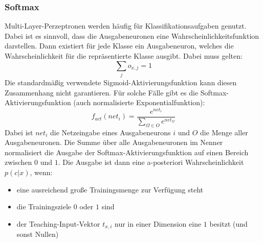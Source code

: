 \subsubsection*{Softmax}
Multi-Layer-Perzeptronen werden häufig für Klassifikationsaufgaben genutzt. Dabei ist es sinnvoll, dass die Ausgabeneuronen eine Wahrscheinlichkeitsfunktion darstellen. Dann existiert für jede Klasse ein Ausgabeneuron, welches die Wahrscheinlichkeit für die repräsentierte Klasse ausgibt. Dabei muss gelten:
\[
	\sum_{j} o_{x,j} = 1
\]
Die standardmäßig verwendete Sigmoid-Aktivierungsfunktion kann diesen Zusammenhang nicht garantieren.
Für solche Fälle gibt es die Softmax-Aktivierungsfunktion (auch normalisierte Exponentialfunktion):
\[
	f_{act}(net_i) = \frac{e^{net_i}}{\sum_{\Omega \in O} e^{net_{\Omega}}}
\]
Dabei ist $net_i$ die Netzeingabe eines Ausgabeneurons $i$ und $O$ die Menge aller Ausgabeneuronen. Die Summe über alle Ausgabeneuronen im Nenner normalisiert die Ausgabe der Softmax-Aktivierungsfunktion auf einen Bereich zwischen $0$ und $1$.
Die Ausgabe ist dann eine a-posteriori Wahrscheinlichkeit $p(c | x)$, wenn:
\begin{itemize}
	\item eine ausreichend große Trainingsmenge zur Verfügung steht
	\item die Trainingsziele $0$ oder $1$ sind
	\item der Teaching-Input-Vektor $t_{x,i}$ nur in einer Dimension eine $1$ besitzt (und sonst Nullen)
\end{itemize}

